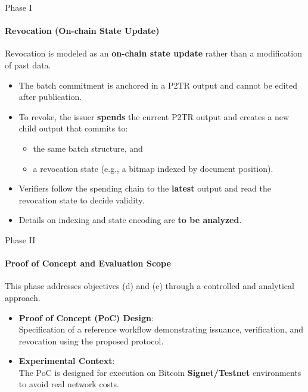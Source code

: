 \begin{frame}{Phase I}
\framesubtitle{Revocation (On-chain State Update)}
Revocation is modeled as an \textbf{on-chain state update} rather than a modification of past data.\\
\vspace*{0.2cm}
\begin{itemize}
    \item The batch commitment is anchored in a P2TR output and cannot be edited after publication.
    \item To revoke, the issuer \textbf{spends} the current P2TR output and creates a new child output that commits to:
    \begin{itemize}
        \item the same batch structure, and
        \item a revocation state (e.g., a bitmap indexed by document position).
    \end{itemize}
    \item Verifiers follow the spending chain to the \textbf{latest} output and read the revocation state to decide validity.
    \item Details on indexing and state encoding are \textbf{to be analyzed}.
\end{itemize}
\end{frame}
\begin{frame}{Phase II}
\framesubtitle{Proof of Concept and Evaluation Scope}
This phase addresses objectives (d) and (e) through a controlled and analytical approach.
\vspace*{0.2cm}
\begin{itemize}
    \item \textbf{Proof of Concept (PoC) Design}:\\
    Specification of a reference workflow demonstrating issuance, verification, and revocation using the proposed protocol.
    \vspace*{0.2cm}
    \item \textbf{Experimental Context}:\\
    The PoC is designed for execution on Bitcoin \textbf{Signet/Testnet} environments to avoid real network costs.
\end{itemize}
\end{frame}

